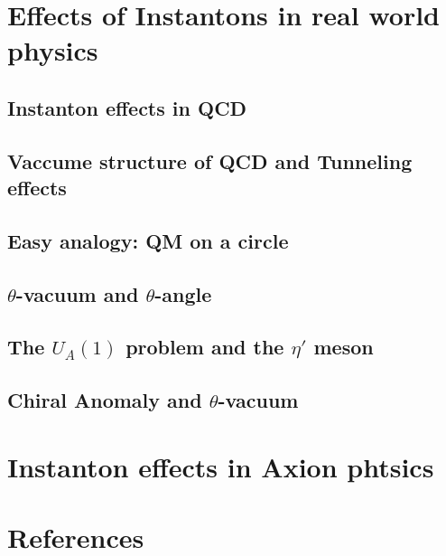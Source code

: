 \documentclass{article}
\begin{document}
\section{Effects of Instantons in real world physics}

\subsection{Instanton effects in QCD}


\subsection{Vaccume structure of QCD and Tunneling effects}


\subsection{Easy analogy: QM on a circle}


\subsection{$\theta$-vacuum and $\theta$-angle}


\subsection{The $U_A(1)$ problem and the $\eta'$ meson}


\subsection{Chiral Anomaly and $\theta$-vacuum}


\section{Instanton effects in Axion phtsics}

\section{References}
\end{document}
